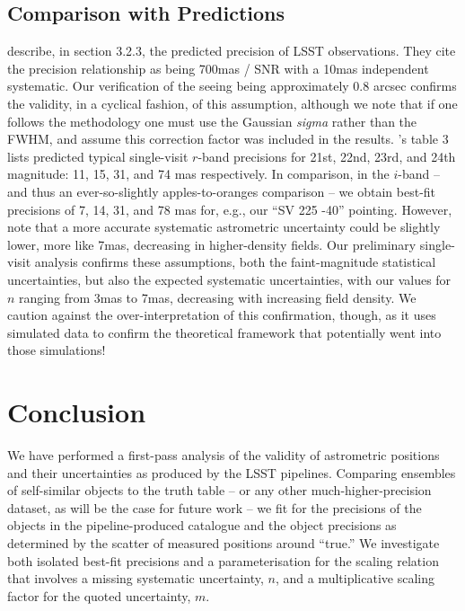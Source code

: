 \documentclass[SE,lsstdraft,authoryear,toc]{lsstdoc}
\begin{document}
\subsection{Comparison with \citet{Ivezic2019} Predictions}
\citet{Ivezic2019} describe, in section 3.2.3, the predicted precision of LSST observations.
They cite the precision relationship as being 700mas / SNR with a 10mas independent systematic.
Our verification of the seeing being approximately 0.8 arcsec confirms the validity, in a cyclical fashion, of this assumption, although we note that if one follows the \citet{King:1983aa} methodology one must use the Gaussian \textit{sigma} rather than the FWHM, and assume this correction factor was included in the \citeauthor{Ivezic2019} results.
\citeauthor{Ivezic2019}'s table 3 lists predicted typical single-visit $r$-band precisions for 21st, 22nd, 23rd, and 24th magnitude: 11, 15, 31, and 74 mas respectively.
In comparison, in the $i$-band -- and thus an ever-so-slightly apples-to-oranges comparison -- we obtain best-fit precisions of 7, 14, 31, and 78 mas for, e.g., our ``SV 225 -40'' pointing.
However, \citet{Ivezic2019} note that a more accurate systematic astrometric uncertainty could be slightly lower, more like 7mas, decreasing in higher-density fields.
Our preliminary single-visit analysis confirms these assumptions, both the faint-magnitude statistical uncertainties, but also the expected systematic uncertainties, with our values for $n$ ranging from 3mas to 7mas, decreasing with increasing field density.
We caution against the over-interpretation of this confirmation, though, as it uses simulated data to confirm the theoretical framework that potentially went into those simulations!

\section{Conclusion}
We have performed a first-pass analysis of the validity of astrometric positions and their uncertainties as produced by the LSST pipelines.
Comparing ensembles of self-similar objects to the truth table -- or any other much-higher-precision dataset, as will be the case for future work -- we fit for the precisions of the objects in the pipeline-produced catalogue and the object precisions as determined by the scatter of measured positions around ``true.''
We investigate both isolated best-fit precisions and a parameterisation for the scaling relation that involves a missing systematic uncertainty, $n$, and a multiplicative scaling factor for the quoted uncertainty, $m$.
\end{document}
